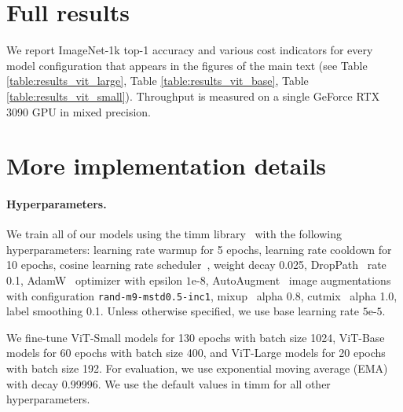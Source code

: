 \vspace*{10pt}
\section{Full results}
We report ImageNet-1k top-1 accuracy and various cost indicators for every model configuration that appears in the figures of the main text (see Table \ref{table:results_vit_large}, Table \ref{table:results_vit_base}, Table \ref{table:results_vit_small}). Throughput is measured on a single GeForce RTX 3090 GPU in mixed precision.


\section{More implementation details}
\paragraph{Hyperparameters.} We train all of our models using the timm library~\cite{rw2019timm} with the following hyperparameters: learning rate warmup for 5 epochs, learning rate cooldown for 10 epochs, cosine learning rate scheduler~\cite{Loshchilov2016SGDRSG}, weight decay 0.025, DropPath~\cite{Huang2016DeepNW} rate 0.1, AdamW~\cite{Loshchilov2017DecoupledWD} optimizer with epsilon $1\text{e-}8$, AutoAugment~\cite{Cubuk2018AutoAugmentLA} image augmentations with configuration \verb|rand-m9-mstd0.5-inc1|, mixup~\cite{Zhang2017mixupBE} alpha 0.8, cutmix~\cite{Yun2019CutMixRS} alpha 1.0, label smoothing 0.1. Unless otherwise specified, we use base learning rate $5\text{e-}5$.

We fine-tune ViT-Small models for 130 epochs with batch size 1024, ViT-Base models for 60 epochs with batch size 400, and ViT-Large models for 20 epochs with batch size 192. For evaluation, we use exponential moving average (EMA)~\cite{Polyak1992AccelerationOS} with decay 0.99996. We use the default values in timm for all other hyperparameters.
